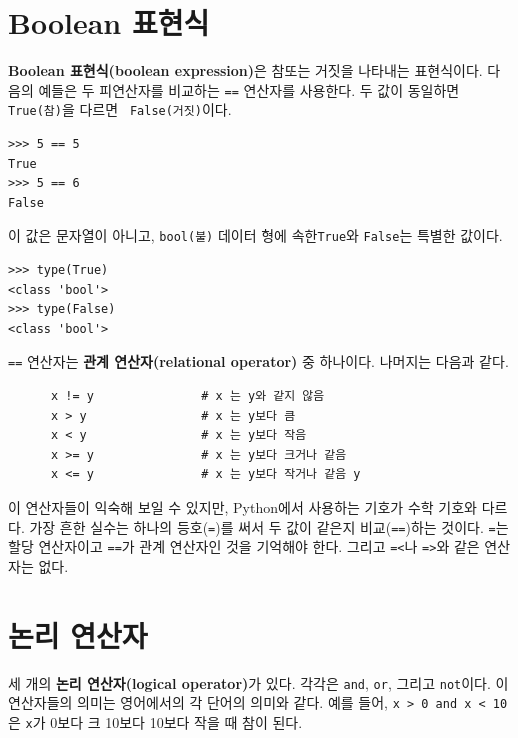 \documentclass[10pt]{book}
\begin{document}
\section{Boolean 표현식}

{\bf Boolean 표현식(boolean expression)}은 참또는 거짓을 나타내는
표현식이다.  다음의 예들은 두 피연산자를 비교하는 {\tt ==} 연산자를
사용한다.  두 값이 동일하면 {\tt True(참)}을 다르면 {\tt
  False(거짓)}이다.

\begin{verbatim}
>>> 5 == 5
True
>>> 5 == 6
False
\end{verbatim}
%
이 값은 문자열이 아니고, {\tt bool(불)} 데이터 형에 속한{\tt True}와
{\tt False}는 특별한 값이다.

\begin{verbatim}
>>> type(True)
<class 'bool'>
>>> type(False)
<class 'bool'>
\end{verbatim}
%
{\tt ==} 연산자는 {\bf 관계 연산자(relational operator)} 중 하나이다.
나머지는 다음과 같다.

\begin{verbatim}
      x != y               # x 는 y와 같지 않음
      x > y                # x 는 y보다 큼
      x < y                # x 는 y보다 작음
      x >= y               # x 는 y보다 크거나 같음
      x <= y               # x 는 y보다 작거나 같음 y
\end{verbatim}
%
이 연산자들이 익숙해 보일 수 있지만, Python에서 사용하는 기호가 수학
기호와 다르다.  가장 흔한 실수는 하나의 등호({\tt =})를 써서 두 값이
같은지 비교({\tt ==})하는 것이다.  {\tt =}는 할당 연산자이고 {\tt ==}가
관계 연산자인 것을 기억해야 한다.  그리고 {\tt =<}나 {\tt =>}와 같은
연산자는 없다.



\section {논리 연산자}
  세 개의 {\bf 논리
  연산자(logical operator)}가 있다. 각각은 {\tt and}, {\tt or}, 그리고
{\tt not}이다.  이 연산자들의 의미는 영어에서의 각 단어의 의미와 같다.
예를 들어, {\tt x > 0 and x < 10} 은 {\tt x}가 0보다 크{} 10보다
10보다 작을 때 참이 된다.
\end{document}
